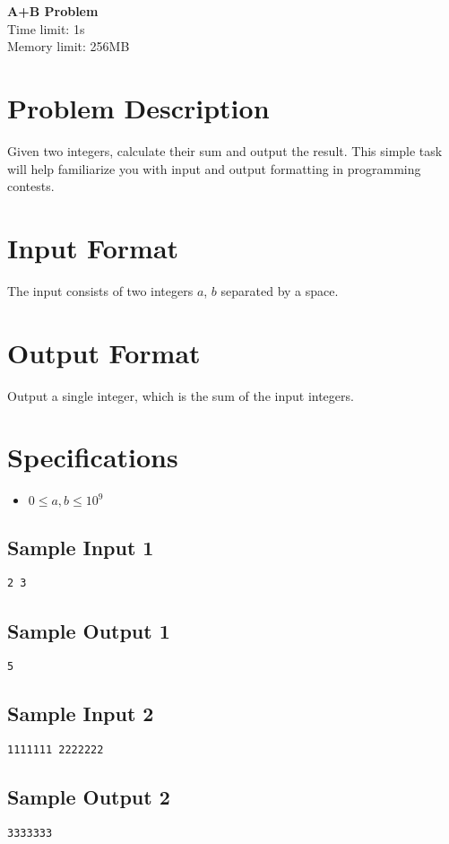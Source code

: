 \documentclass[12pt, a4paper]{article}
\begin{document}
\begin{center}
    \parbox{0.8\textwidth}{
        \centering
        \vspace{0.5em}
        \LARGE \textbf{A+B Problem}\\[0.5em]
        \large{Time limit: 1s}\\
        \large{Memory limit: 256MB}\\[0.8em]
    }
\end{center}
\thispagestyle{fancy}

\section*{Problem Description}
Given two integers, calculate their sum and output the result. This simple task will help familiarize you with input and output formatting in programming contests.

\section*{Input Format}
The input consists of two integers $a$, $b$ separated by a space.

\section*{Output Format}
Output a single integer, which is the sum of the input integers.

\section*{Specifications}
\begin{itemize}
    \item $0 \le a, b \le 10^9$
\end{itemize}

\begin{paracol}{2}
    \subsection*{Sample Input 1}
    \begin{lstlisting}
2 3
    \end{lstlisting}
    \switchcolumn
    \subsection*{Sample Output 1}
    \begin{lstlisting}
5
    \end{lstlisting}
\end{paracol}

\begin{paracol}{2}
    \subsection*{Sample Input 2}
    \begin{lstlisting}
1111111 2222222
    \end{lstlisting}
    \switchcolumn
    \subsection*{Sample Output 2}
    \begin{lstlisting}
3333333
    \end{lstlisting}
\end{paracol}
\end{document}
